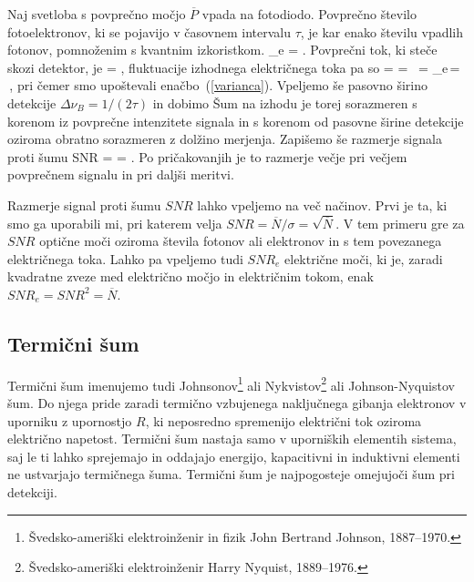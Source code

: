 Naj svetloba s povprečno močjo $\overline{P}$ vpada na fotodiodo.
Povprečno število fotoelektronov, ki se pojavijo v časovnem intervalu 
$\tau$, je kar enako številu vpadlih fotonov, pomnoženim 
s kvantnim izkoristkom. 
\beq
{}_e = \eta.
\eeq
Povprečni tok, ki steče skozi detektor, je  
\beq
{} = ,
\eeq
fluktuacije izhodnega električnega toka pa so
\beq
{}= = \,
 = _e\,= \,,
\eeq
pri čemer smo upoštevali enačbo~(\ref{varianca}). Vpeljemo še pasovno širino 
detekcije $\Delta\nu_B = 1/(2\tau)$ in dobimo
Šum na izhodu je torej sorazmeren s korenom iz povprečne intenzitete signala in 
s korenom od pasovne širine detekcije oziroma obratno sorazmeren z dolžino 
merjenja. Zapišemo še razmerje signala proti šumu 
\beq
SNR = = 
{}.
\eeq
Po pričakovanjih je to razmerje večje pri večjem povprečnem signalu in pri daljši meritvi.

\begin{remark}
Razmerje signal proti šumu $SNR$ lahko vpeljemo na več načinov. Prvi je ta, ki smo ga 
uporabili mi, pri katerem velja $SNR = \overline{N}/\sigma = \sqrt{\overline{N}}$. 
V tem primeru gre za $SNR$ optične moči oziroma števila fotonov ali elektronov in s 
tem povezanega električnega toka. Lahko pa vpeljemo tudi $SNR_e$ električne moči, ki je, 
zaradi kvadratne zveze med električno močjo in električnim tokom, enak $SNR_e=SNR^2=\overline{N}$.
\end{remark}

\subsection*{Termični šum} 
Termični šum imenujemo tudi Johnsonov\footnote{Švedsko-ameriški elektroinženir in fizik 
John Bertrand Johnson, 1887--1970.} ali Nykvistov\footnote{Švedsko-ameriški elektroinženir
Harry Nyquist, 1889--1976.} ali Johnson-Nyquistov šum. 
Do njega pride zaradi 
termično vzbujenega naključnega gibanja elektronov v uporniku z upornostjo $R$, 
ki neposredno spremenijo električni tok oziroma električno napetost. 
Termični šum nastaja samo v uporniških elementih sistema, saj le ti lahko
sprejemajo in oddajajo energijo, kapacitivni in induktivni elementi
ne ustvarjajo termičnega šuma. Termični šum je najpogosteje omejujoči šum pri detekciji.

